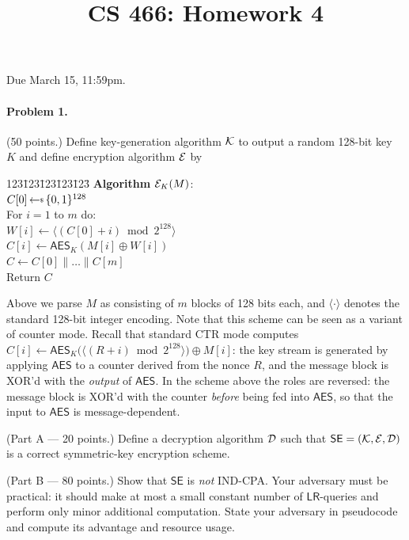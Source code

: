 \documentclass[11pt]{article}
\title{CS 466: Homework 4}
\date{}
\newcommand{\getsr}{{{\,\leftarrow{\hspace*{-3pt}\raisebox{.75pt}{$\scriptscriptstyle\$$}}\,}}}
\newcommand{\bits}{\{0,1\}}
\newcommand{\schemefont}[1]{{\mathsf{#1}}}
\newcommand{\LR}{\mathsf{LR}}
\newcommand{\calK}{{\cal K}}
\newcommand{\calD}{{\cal D}}
\newcommand{\calE}{{\cal E}}
\begin{document}
\maketitle
\thispagestyle{fancy}

\noindent Due March 15, 11:59pm.


\paragraph*{Problem 1.} (50 points.)
Define key-generation algorithm $\calK$ to output a random 128-bit key
$K$ and define encryption algorithm $\calE$ by
\begin{center}
\begin{minipage}{1.6in}
\begin{tabbing}
123\=123\=123\=123\=123\=\kill
\textbf{Algorithm} $\calE_K(M)$: \\
\> $C[0] \getsr \bits^{128}$ \\
\> For $i = 1$ to $m$ do: \\
\>\> $W[i] \gets \langle (C[0] + i) \bmod 2^{128} \rangle$ \\
\>\> $C[i] \gets \mathsf{AES}_K(M[i] \oplus W[i])$ \\
\> $C \gets C[0] \| \ldots \| C[m]$ \\
\> Return $C$
\end{tabbing}
\end{minipage}
\end{center}
Above we parse $M$ as consisting of $m$ blocks of 128 bits each, and
$\langle \cdot \rangle$ denotes the standard 128-bit integer encoding.
Note that this scheme can be seen as a variant of counter mode. Recall that standard CTR mode computes
$C[i] \gets \mathsf{AES}_K\!\bigl(\langle(R + i) \bmod 2^{128}\rangle\bigr) \oplus M[i]$:
the key stream is generated by applying $\mathsf{AES}$ to a counter derived from
the nonce $R$, and the message block is XOR'd with the \emph{output} of $\mathsf{AES}$.
In the scheme above the roles are reversed: the message block is XOR'd with the
counter \emph{before} being fed into $\mathsf{AES}$, so that the input to $\mathsf{AES}$
is message-dependent.

\medskip\noindent (Part A --- 20 points.)
Define a decryption algorithm $\calD$ such that
$\schemefont{SE} = (\calK, \calE, \calD)$ is a correct symmetric-key
encryption scheme.

\medskip\noindent (Part B --- 80 points.)
Show that $\schemefont{SE}$ is \emph{not} IND-CPA.
Your adversary must be practical: it should make at most a small constant
number of $\LR$-queries and perform only minor additional computation.
State your adversary in pseudocode and compute its advantage and resource usage.
\end{document}
